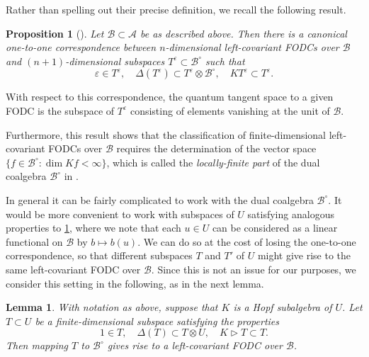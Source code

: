 \documentclass[a4paper, 12pt, reqno, english]{amsart}
\numberwithin{equation}{section}
\numberwithin{figure}{section}
\theoremstyle{plain}
\theoremstyle{plain}
\theoremstyle{plain}
\newtheorem{proposition}[theorem]{Proposition}
\theoremstyle{plain}
\newtheorem{lemma}[theorem]{Lemma}
\theoremstyle{plain}
\theoremstyle{definition}
\theoremstyle{definition}
\theoremstyle{definition}
\theoremstyle{remark}
\theoremstyle{definition}
\theoremstyle{definition}
\newcommand{\calA}{\mathcal{A}}
\newcommand{\calB}{\mathcal{B}}
\begin{document}
Rather than spelling out their precise definition, we recall the following result.

\begin{proposition}[{\cite[Corollary 5]{heko-homogeneous}}]
\label{prop:calculi-correspondence}
Let $\calB \subset \calA$ be as described above. Then there is a canonical one-to-one correspondence between $n$-dimensional left-covariant FODCs over $\calB$ and $(n + 1)$-dimensional subspaces $T^\varepsilon \subset \calB^\circ$ such that
\[
\varepsilon \in T^\varepsilon, \quad
\Delta(T^\varepsilon) \subset T^\varepsilon \otimes \calB^\circ, \quad
K T^\varepsilon \subset T^\varepsilon.
\]
\end{proposition}

With respect to this correspondence, the quantum tangent space to a given FODC is the subspace of $T^\varepsilon$ consisting of elements vanishing at the unit of $\calB$.

Furthermore, this result shows that the classification of finite-dimensional left-covariant FODCs over $\calB$ requires the determination of the vector space $\{ f \in \calB^\circ : \dim K f < \infty \}$, which is called the \emph{locally-finite part} of the dual coalgebra $\calB^\circ$ in \cite{heko-homogeneous}.

In general it can be fairly complicated to work with the dual coalgebra $\calB^\circ$.
It would be more convenient to work with subspaces of $U$ satisfying analogous properties to \cref{prop:calculi-correspondence}, where we note that each $u \in U$ can be considered as a linear functional on $\calB$ by $b \mapsto b(u)$.
We can do so at the cost of losing the one-to-one correspondence, so that different subspaces $T$ and $T'$ of $U$ might give rise to the same left-covariant FODC over $\calB$.
Since this is not an issue for our purposes, we consider this setting in the following, as in the next lemma.

\begin{lemma}
\label{lem:tangent-covariant}
With notation as above, suppose that $K$ is a Hopf subalgebra of $U$.
Let $T \subset U$ be a finite-dimensional subspace satisfying the properties
\[
1 \in T, \quad
\Delta(T) \subset T \otimes U, \quad
K \triangleright T \subset T.
\]
Then mapping $T$ to $\calB^\circ$ gives rise to a left-covariant FODC over $\calB$.
\end{lemma}
\end{document}
